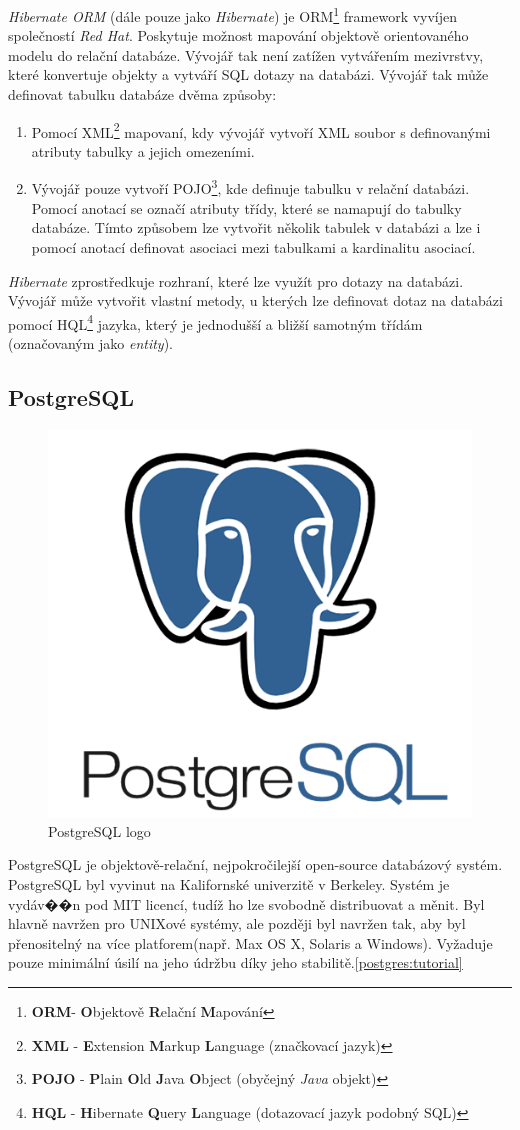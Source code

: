 \emph{Hibernate ORM} (dále pouze jako \emph{Hibernate}) je ORM\footnote{\textbf{ORM}- \textbf{O}bjektově \textbf{R}elační \textbf{M}apování} framework vyvíjen společností \emph{Red Hat}.
Poskytuje možnost mapování objektově orientovaného modelu do relační databáze. Vývojář tak není zatížen vytvářením mezivrstvy, které konvertuje objekty a vytváří SQL dotazy na databázi.
Vývojář tak může definovat tabulku databáze dvěma způsoby:
\begin{enumerate}
  \item Pomocí XML\footnote{\textbf{XML} - \textbf{E}xtension \textbf{M}arkup \textbf{L}anguage (značkovací jazyk)} mapovaní, kdy vývojář vytvoří XML soubor s definovanými atributy tabulky a jejich omezeními.
  \item Vývojář pouze vytvoří POJO\footnote{\textbf{POJO} - \textbf{P}lain \textbf{O}ld \textbf{J}ava \textbf{O}bject (obyčejný \emph{Java} objekt)}, kde definuje tabulku v relační databázi. Pomocí anotací se označí atributy třídy, které se namapují do tabulky databáze.
        Tímto způsobem lze vytvořit několik tabulek v databázi a lze i pomocí anotací definovat asociaci mezi tabulkami a kardinalitu asociací.
\end{enumerate}
\emph{Hibernate} zprostředkuje rozhraní, které lze využít pro dotazy na databázi. Vývojář může vytvořit vlastní metody, u kterých lze definovat dotaz na databázi pomocí HQL\footnote{\textbf{HQL} - \textbf{H}ibernate \textbf{Q}uery \textbf{L}anguage (dotazovací jazyk podobný SQL)} jazyka,
který je jednodušší a bližší samotným třídám (označovaným jako \emph{entity}).

\subsection*{PostgreSQL}
\label{pouzite:postgresql}
\begin{figure}[hbt]
  \centering
  \includegraphics[width=.2 \linewidth]{obrazky-figures/postgresql-logo.png}
  \caption{PostgreSQL logo}
\end{figure}

PostgreSQL je objektově-relační, nejpokročilejší open-source databázový systém.
PostgreSQL byl vyvinut na Kalifornské univerzitě v Berkeley.
Systém je vydáv��n pod MIT licencí, tudíž ho lze svobodně distribuovat a měnit.
Byl hlavně navržen pro UNIXové systémy, ale později byl navržen tak, aby byl přenositelný na více platforem(např. Max OS X, Solaris a Windows).
Vyžaduje pouze minimální úsilí na jeho údržbu díky jeho stabilitě.\ref{postgres:tutorial}

